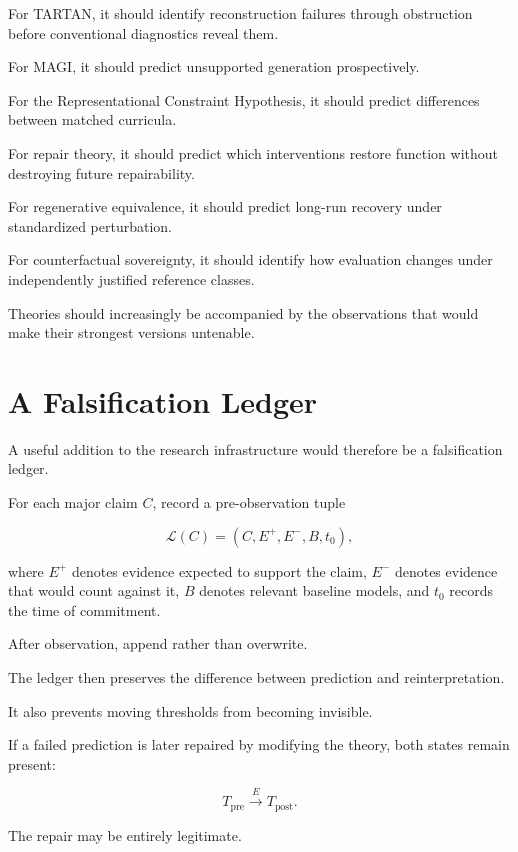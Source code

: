 \documentclass[11pt]{article}
\theoremstyle{remark}
\newcommand{\TARTAN}{\textsc{TARTAN}}
\newcommand{\MAGI}{\textsc{MAGI}}
\begin{document}
For \TARTAN{}, it should identify reconstruction failures through obstruction
before conventional diagnostics reveal them.

For \MAGI{}, it should predict unsupported generation prospectively.

For the Representational Constraint Hypothesis, it should predict differences
between matched curricula.

For repair theory, it should predict which interventions restore function
without destroying future repairability.

For regenerative equivalence, it should predict long-run recovery under
standardized perturbation.

For counterfactual sovereignty, it should identify how evaluation changes under
independently justified reference classes.

Theories should increasingly be accompanied by the observations that would make
their strongest versions untenable.

\section{A Falsification Ledger}

A useful addition to the research infrastructure would therefore be a
falsification ledger.

For each major claim $C$, record a pre-observation tuple

\begin{equation}
\mathcal{L}(C)
=
(
C,
E^+,
E^-,
B,
t_0
),
\end{equation}

where $E^+$ denotes evidence expected to support the claim, $E^-$ denotes
evidence that would count against it, $B$ denotes relevant baseline models, and
$t_0$ records the time of commitment.

After observation, append rather than overwrite.

The ledger then preserves the difference between prediction and
reinterpretation.

It also prevents moving thresholds from becoming invisible.

If a failed prediction is later repaired by modifying the theory, both states
remain present:

\begin{equation}
T_{\mathrm{pre}}
\xrightarrow{E}
T_{\mathrm{post}}.
\end{equation}

The repair may be entirely legitimate.
\end{document}
